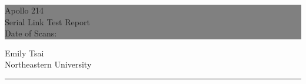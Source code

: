 \documentclass{report}
\begin{document}

\begin{titlepage} %


  \colorbox{grey}{
    \parbox[t]{0.93\textwidth}{ %
      \parbox[t]{0.91\textwidth}{ %
        \raggedleft %
        \fontsize{80pt}{40pt}\selectfont %
        \vspace{0.7cm} %
        Apollo 214 \\
        Serial Link Test Report \\
        Date of Scans: \dateofscans \\
        \vspace{0.7cm} %
      }
    }
  }

  \vfill %


  \parbox[t]{0.93\textwidth}{ %
    \raggedleft %
    \large %
    {\Large Emily Tsai} \\[4pt] %
    Northeastern University \\[4pt] %
    \hfill\rule{0.2\linewidth}{1pt} %
  }

\end{titlepage}

\hypertarget{MyToc}{} %
\tableofcontents
\newpage

\end{document}
